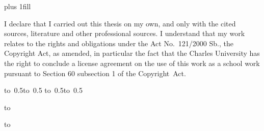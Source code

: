 \newpage


\openright
\hypersetup{pageanchor=true}
\vglue 0pt plus 1fill

\noindent
I declare that I carried out this \ThesisTypeName{} thesis on my own, and only with the cited
sources, literature and other professional sources.
I understand that my work relates to the rights and obligations under the Act No.~121/2000 Sb.,
the Copyright Act, as amended, in particular the fact that the Charles
University has the right to conclude a license agreement on the use of this
work as a school work pursuant to Section 60 subsection 1 of the Copyright~Act.

\vspace{10mm}

\hbox{\hbox to 0.5\hbox to 0.5\hsize{\dotfill\quad}}
\smallskip
\hbox{\hbox to 0.5\hsize{}\hbox to 0.5}

\vspace{20mm}
\newpage


\openright

\noindent
\Dedication

\newpage


\openright
{\InfoPageFont

\vtop to 

}

\newpage


\ifx\StudyLanguage\LangCS
{\InfoPageFont

\vtop to 

}

\fi

\newpage

\pagestyle{plain}
